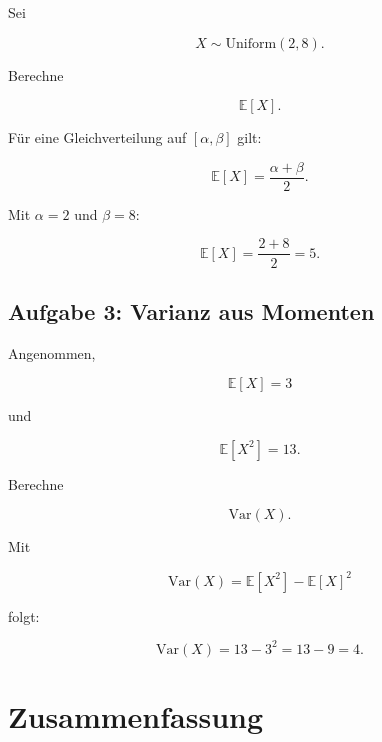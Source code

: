Sei

\[
    X \sim \mathrm{Uniform}(2,8).
\]

Berechne

\[
    \mathbb{E}[X].
\]

\begin{examplebox}
Für eine Gleichverteilung auf \([\alpha,\beta]\) gilt:

\[
    \mathbb{E}[X]
    =
    \frac{\alpha+\beta}{2}.
\]

Mit \(\alpha=2\) und \(\beta=8\):

\[
    \mathbb{E}[X]
    =
    \frac{2+8}{2}
    =
    5.
\]
\end{examplebox}

\subsection{Aufgabe 3: Varianz aus Momenten}

Angenommen,

\[
    \mathbb{E}[X] = 3
\]

und

\[
    \mathbb{E}[X^2] = 13.
\]

Berechne

\[
    \mathrm{Var}(X).
\]

\begin{examplebox}
Mit

\[
    \mathrm{Var}(X)
    =
    \mathbb{E}[X^2]
    -
    \mathbb{E}[X]^2
\]

folgt:

\[
    \mathrm{Var}(X)
    =
    13 - 3^2
    =
    13 - 9
    =
    4.
\]
\end{examplebox}

\section{Zusammenfassung}

